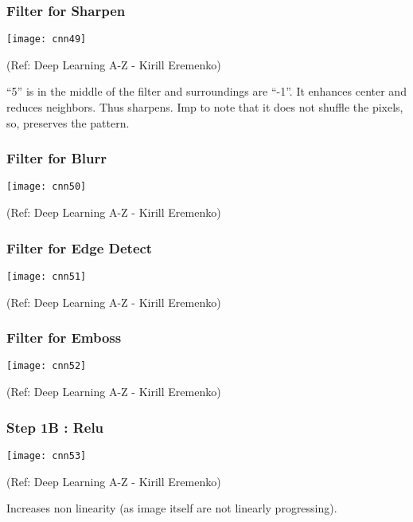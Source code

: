 \begin{frame}[fragile] \frametitle{Filter for Sharpen}

\begin{center}
\texttt{[image: cnn49]}

\tiny{(Ref: Deep Learning A-Z - Kirill Eremenko)}
\end{center}

``5'' is in the middle of the filter and surroundings are ``-1''.  It enhances center and reduces neighbors. Thus sharpens.
Imp to note that it does not shuffle the pixels, so, preserves the pattern.
\end{frame}

\begin{frame}[fragile] \frametitle{Filter for Blurr}

\begin{center}
\texttt{[image: cnn50]}

\tiny{(Ref: Deep Learning A-Z - Kirill Eremenko)}
\end{center}

\end{frame}

\begin{frame}[fragile] \frametitle{Filter for Edge Detect}

\begin{center}
\texttt{[image: cnn51]}

\tiny{(Ref: Deep Learning A-Z - Kirill Eremenko)}
\end{center}

\end{frame}

\begin{frame}[fragile] \frametitle{Filter for Emboss}

\begin{center}
\texttt{[image: cnn52]}

\tiny{(Ref: Deep Learning A-Z - Kirill Eremenko)}
\end{center}

\end{frame}

\begin{frame}[fragile] \frametitle{Step 1B : Relu}

\begin{center}
\texttt{[image: cnn53]}

\tiny{(Ref: Deep Learning A-Z - Kirill Eremenko)}
\end{center}

 Increases non linearity (as image itself are not linearly progressing).


\end{frame}


